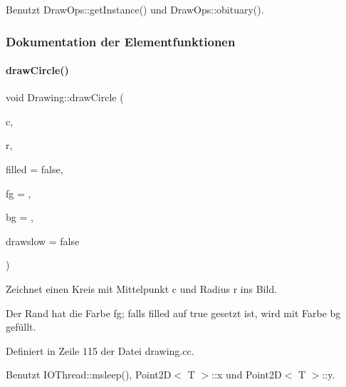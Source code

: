 Benutzt Draw\+Ops\+::get\+Instance() und Draw\+Ops\+::obituary().



\subsubsection{Dokumentation der Elementfunktionen}
\mbox{\label{classDrawing_a28721ef60cde505e521e391f698f21fe}} 
\paragraph{\texorpdfstring{draw\+Circle()}{drawCircle()}}
{\footnotesize\ttfamily void Drawing\+::draw\+Circle (\begin{DoxyParamCaption}\item[{\mbox{\hyperlink{point2d_8h_aeeeb57e4186edb0a4274b64925e0d0fb}{I\+Point2D}}}]{c,  }\item[{int}]{r,  }\item[{bool}]{filled = {\ttfamily false},  }\item[{\mbox{\hyperlink{classDrawColour}{Draw\+Colour}}}]{fg = {},  }\item[{\mbox{\hyperlink{classDrawColour}{Draw\+Colour}}}]{bg = {},  }\item[{bool}]{drawslow = {\ttfamily false} }\end{DoxyParamCaption})}



Zeichnet einen Kreis mit Mittelpunkt {\ttfamily c} und Radius {\ttfamily r} ins Bild. 

Der Rand hat die Farbe {\ttfamily fg}; falls {\ttfamily filled} auf {\ttfamily true} gesetzt ist, wird mit Farbe {\ttfamily bg} gefüllt. 

Definiert in Zeile 115 der Datei drawing.\+cc.



Benutzt I\+O\+Thread\+::msleep(), Point2\+D$<$ T $>$\+::x und Point2\+D$<$ T $>$\+::y.

\mbox{\label{classDrawing_a80093353d917a5f15ba631eeb546d97c}} 
